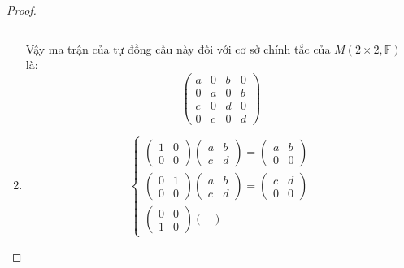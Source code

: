 \documentclass[class=linearalgebra,crop=false]{standalone}
\begin{document}
\begin{proof}
\begin{enumerate}[label = (\alph*)]
\[            \]
            \par Vậy ma trận của tự đồng cấu này đối với cơ sở chính tắc của $M(2\times 2,\mathbb{F})$ là:
            \[
                \begin{pmatrix}
                    a & 0 & b & 0 \\
                    0 & a & 0 & b \\
                    c & 0 & d & 0 \\
                    0 & c & 0 & d
                \end{pmatrix}
            \]
        \item
            \[
                \begin{cases}
                    \begin{pmatrix}
                        1 & 0 \\
                        0 & 0
                    \end{pmatrix}
                    \begin{pmatrix}
                        a & b \\
                        c & d
                    \end{pmatrix}=
                    \begin{pmatrix}
                        a & b \\
                        0 & 0
                    \end{pmatrix} \\
                    \begin{pmatrix}
                        0 & 1 \\
                        0 & 0
                    \end{pmatrix}
                    \begin{pmatrix}
                        a & b \\
                        c & d
                    \end{pmatrix}=
                    \begin{pmatrix}
                        c & d \\
                        0 & 0
                    \end{pmatrix} \\
                    \begin{pmatrix}
                        0 & 0 \\
                        1 & 0
                    \end{pmatrix}
                    \begin{pmatrix}

\end{pmatrix}
\end{cases}\]
\end{enumerate}
\end{proof}
\end{document}
